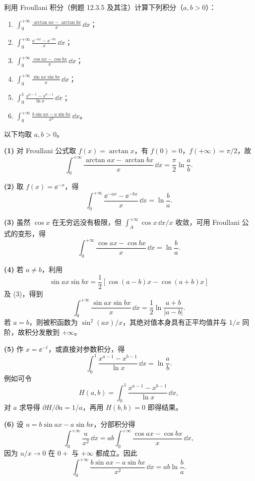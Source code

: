 \begin{xexercise}[4]
利用 Froullani 积分（例题 12.3.5 及其注）计算下列积分（$a,b>0$）：
  \begin{enumerate}[label=(\arabic*)]
    \item $\displaystyle\int_0^{+\infty}\frac{\arctan ax-\arctan bx}{x}\,\dd x$；
    \item $\displaystyle\int_0^{+\infty}\frac{\ee^{-ax}-\ee^{-bx}}x\,\dd x$；
    \item $\displaystyle\int_0^{+\infty}\frac{\cos ax-\cos bx}{x}\,\dd x$；
    \item $\displaystyle\int_0^{+\infty}\frac{\sin ax\sin bx}{x}\,\dd x$；
    \item $\displaystyle\int_0^1\frac{x^{a-1}-x^{b-1}}{\ln x}\,\dd x$；
    \item $\displaystyle\int_0^{+\infty}\frac{b\sin ax-a\sin bx}{x^2}\,\dd x$。
  \end{enumerate}
\end{xexercise}
\begin{xsolution}
以下均取 $a,b>0$。

\textbf{(1)} 对 Froullani 公式取 $f(x)=\arctan x$，有 $f(0)=0$，$f(+\infty)=\pi/2$，故
\[
  \boxed{\int_0^{+\infty}\frac{\arctan ax-\arctan bx}{x}\,\dd x
  =\frac\pi2\ln\frac ab}.
\]

\textbf{(2)} 取 $f(x)=\ee^{-x}$，得
\[
  \boxed{\int_0^{+\infty}\frac{\ee^{-ax}-\ee^{-bx}}x\,\dd x=\ln\frac ba}.
\]

\textbf{(3)} 虽然 $\cos x$ 在无穷远没有极限，但 $\int_A^{+\infty}\cos x\,\dd x/x$ 收敛，可用 Froullani 公式的变形，得
\[
  \boxed{\int_0^{+\infty}\frac{\cos ax-\cos bx}{x}\,\dd x=\ln\frac ba}.
\]

\textbf{(4)} 若 $a\ne b$，利用
\[
  \sin ax\sin bx=\frac12[\cos(a-b)x-\cos(a+b)x]
\]
及 (3)，得到
\[
  \boxed{\int_0^{+\infty}\frac{\sin ax\sin bx}{x}\,\dd x
  =\frac12\ln\frac{a+b}{|a-b|}}.
\]
若 $a=b$，则被积函数为 $\sin^2(ax)/x$，其绝对值本身具有正平均值并与 $1/x$ 同阶，故积分发散到 $+\infty$。

\textbf{(5)} 作 $x=\ee^{-t}$，或直接对参数积分，得
\[
  \boxed{\int_0^1\frac{x^{a-1}-x^{b-1}}{\ln x}\,\dd x=\ln\frac ab}.
\]
例如可令
\[
  H(a,b)=\int_0^1\frac{x^{a-1}-x^{b-1}}{\ln x}\,\dd x,
\]
对 $a$ 求导得 $\partial H/\partial a=1/a$，再用 $H(b,b)=0$ 即得结果。

\textbf{(6)} 设 $u=b\sin ax-a\sin bx$，分部积分得
\[
  \int_0^{+\infty}\frac{u}{x^2}\,\dd x
  =ab\int_0^{+\infty}\frac{\cos ax-\cos bx}{x}\,\dd x,
\]
因为 $u/x\to0$ 在 $0+$ 与 $+\infty$ 都成立。因此
\[
  \boxed{\int_0^{+\infty}\frac{b\sin ax-a\sin bx}{x^2}\,\dd x
  =ab\ln\frac ba}.
\]
\end{xsolution}



